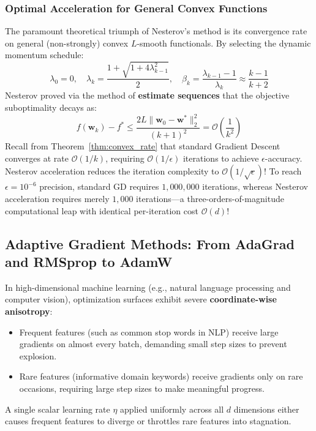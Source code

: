 \subsubsection{Optimal Acceleration for General Convex Functions}
The paramount theoretical triumph of Nesterov's method is its convergence rate on general (non-strongly) convex $L$-smooth functionals. By selecting the dynamic momentum schedule:
\begin{equation}
\lambda_0 = 0, \quad \lambda_k = \frac{1 + \sqrt{1 + 4\lambda_{k-1}^2}}{2}, \quad \beta_k = \frac{\lambda_{k-1} - 1}{\lambda_k} \approx \frac{k - 1}{k + 2}
\label{eq:nesterov_schedule}
\end{equation}
Nesterov proved via the method of \textbf{estimate sequences} that the objective suboptimality decays as:
\begin{equation}
f(\mathbf{w}_k) - f^* \le \frac{2 L \|\mathbf{w}_0 - \mathbf{w}^*\|_2^2}{(k + 1)^2} = \mathcal{O}\left( \frac{1}{k^2} \right)
\label{eq:nesterov_rate}
\end{equation}
Recall from Theorem~\ref{thm:convex_rate} that standard Gradient Descent converges at rate $\mathcal{O}(1/k)$, requiring $\mathcal{O}(1/\epsilon)$ iterations to achieve $\epsilon$-accuracy. Nesterov acceleration reduces the iteration complexity to $\mathcal{O}(1/\sqrt{\epsilon})$!
To reach $\epsilon = 10^{-6}$ precision, standard GD requires $1{,}000{,}000$ iterations, whereas Nesterov acceleration requires merely $1{,}000$ iterations---a three-orders-of-magnitude computational leap with identical per-iteration cost $\mathcal{O}(d)$!

\subsection{Adaptive Gradient Methods: From AdaGrad and RMSprop to AdamW}
In high-dimensional machine learning (e.g., natural language processing and computer vision), optimization surfaces exhibit severe \textbf{coordinate-wise anisotropy}:
\begin{itemize}
    \item Frequent features (such as common stop words in NLP) receive large gradients on almost every batch, demanding small step sizes to prevent explosion.
    \item Rare features (informative domain keywords) receive gradients only on rare occasions, requiring large step sizes to make meaningful progress.
\end{itemize}
A single scalar learning rate $\eta$ applied uniformly across all $d$ dimensions either causes frequent features to diverge or throttles rare features into stagnation.

